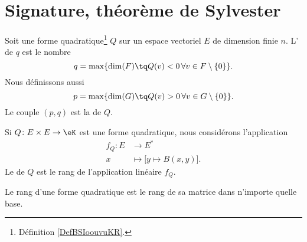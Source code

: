 \section{Signature, théorème de Sylvester}

\begin{definition}       \label{DEFooWDCLooDkRYLK}
    Soit une forme quadratique\footnote{Définition \ref{DefBSIoouvuKR}.} \( Q\) sur un espace vectoriel \( E\) de dimension finie \( n\). L' de \( q\) est le nombre
    \begin{equation}
        q=\max\{ \dim(F)\tq Q(v)<0\,\forall v\in F\setminus\{ 0 \} \}.
    \end{equation}
    Nous définissons aussi
    \begin{equation}
        p=\max\{ \dim(G)\tq Q(v)>0\,\forall v\in G\setminus\{ 0 \} \}.
    \end{equation}
    Le couple \( (p,q)\) est la  de \( Q\).
\end{definition}

\begin{definition}        \label{DEFooVITQooQaMaTF}
    Si \( Q\colon E\times E\to \eK\) est une forme quadratique, nous considérons l'application
    \begin{equation}
        \begin{aligned}
            f_Q\colon E&\to E^* \\
            x&\mapsto \big[ y\mapsto B(x,y) \big]. 
        \end{aligned}
    \end{equation}
    Le  de \( Q\) est le rang de l'application linéaire \( f_Q\).
\end{definition}

\begin{proposition}     \label{PROPooLRZQooSfprff}
    Le rang d'une forme quadratique est le rang de sa matrice dans n'importe quelle base.
\end{proposition}

